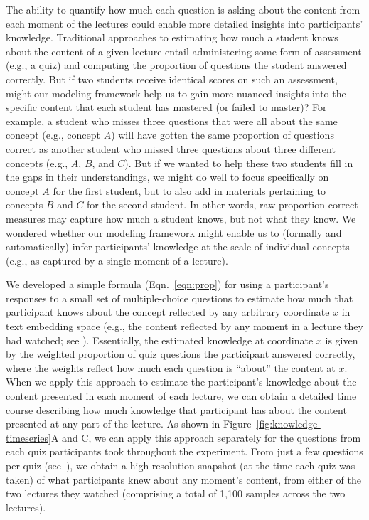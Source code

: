 \documentclass[10pt]{article}
\renewcommand{\nameref}[1]{\textit{\oldnameref{#1}}}
\begin{document}
The ability to quantify how much each question is asking about the content
from each moment of the lectures could enable more detailed insights into
participants' knowledge. Traditional approaches to estimating how much a
student knows about the content of a given lecture entail administering some form of assessment (e.g., a quiz) and computing the
proportion of questions the student answered correctly. But if two students receive
identical scores on such an assessment, might our modeling framework help us to gain more
nuanced insights into the specific content that each student has
mastered (or failed to master)? For example, a student who misses three
questions that were all about the same concept (e.g., concept $A$) will have
gotten the same proportion of questions correct as another student who
missed three questions about three different concepts (e.g., $A$, $B$,
and $C$). But if we wanted to help these two students fill in the gaps in
their understandings, we might do well to focus specifically on concept $A$ for
the first student, but to also add in materials pertaining to concepts $B$ and
$C$ for the second student. In other words, raw proportion-correct measures
may capture how much a student knows, but not what they know.
We wondered whether our modeling framework might enable us to (formally and
automatically) infer participants' knowledge at the scale of individual
concepts (e.g., as captured by a single moment of a lecture).

We developed a simple formula (Eqn.~\ref{eqn:prop}) for using a participant's
responses to a small set of multiple-choice questions to estimate how much that
participant knows about the concept reflected by any arbitrary coordinate
$x$ in text embedding space (e.g., the content reflected by any moment in a
lecture they had watched; see \nameref{subsec:traces}). Essentially, the
estimated knowledge at coordinate $x$ is given by the weighted
proportion of quiz questions the participant answered correctly, where the
weights reflect how much each question is ``about'' the content at $x$. When we
apply this approach to estimate the participant's knowledge about the content
presented in each moment of each lecture, we can obtain a detailed time course
describing how much knowledge that participant has about the content
presented at any part of the lecture. As shown in
Figure~\ref{fig:knowledge-timeseries}A and C, we can apply this approach
separately for the questions from each quiz participants took throughout the
experiment. From just a few questions per quiz (see~\nameref{subsec:traces}),
we obtain a high-resolution snapshot (at the time each quiz was taken) of what
participants knew about any moment's content, from either of the two
lectures they watched (comprising a total of 1,100 samples across the two
lectures).
\end{document}
